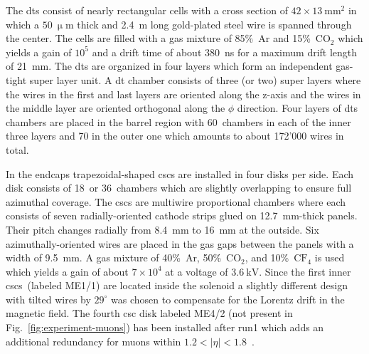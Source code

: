
The \glspl{dt} consist of nearly rectangular cells with a cross section of $42\times 13~\mathrm{mm}^{2}$ in which a $50~\upmu\mathrm{m}$ thick and 2.4~m long gold-plated steel wire is spanned through the center. The cells are filled with a gas mixture of 85\%~Ar and 15\%~$\mathrm{CO}_{2}$ which yields a gain of $10^{5}$ and a drift time of about 380~ns for a maximum drift length of 21~mm. The \glspl{dt} are organized in four layers which form an independent gas-tight super layer unit. A \gls{dt} chamber consists of three (or two) super layers where the wires in the first and last layers are oriented along the z-axis and the wires in the middle layer are oriented orthogonal along the $\phi$ direction. Four layers of \glspl{dt} chambers are placed in the barrel region with 60~chambers in each of the inner three layers and 70 in the outer one which amounts to about 172'000 wires in total.

In the endcaps trapezoidal-shaped \glspl{csc} are installed in four disks per side. Each disk consists of 18~or 36~chambers which are slightly overlapping to ensure full azimuthal coverage. The \glspl{csc} are multiwire proportional chambers where each consists of seven radially-oriented cathode strips glued on 12.7~mm-thick panels. Their pitch changes radially from 8.4~mm to 16~mm at the outside. Six azimuthally-oriented wires are placed in the gas gaps between the panels with a width of 9.5~mm. A gas mixture of 40\%~Ar, 50\%~$\mathrm{CO_{2}}$, and 10\%~$\mathrm{CF}_{4}$ is used which yields a gain of about $7\times10^{4}$ at a voltage of $3.6~\mathrm{kV}$. Since the first inner \glspl{csc}~(labeled ME1/1) are located inside the solenoid a slightly different design with tilted wires by $29^{\circ}$ was chosen to compensate for the Lorentz drift in the magnetic field. The fourth \gls{csc} disk labeled ME4/2 (not present in Fig.~\ref{fig:experiment-muons}) has been installed after \gls{run1} which adds an additional redundancy for muons within $1.2<|\eta|<1.8$~\cite{Wulsin:2015shd}.

